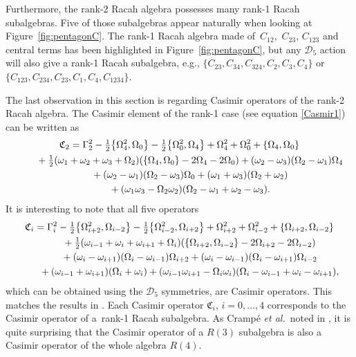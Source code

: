 \documentclass[pdftex]{sigma}
\numberwithin{equation}{section}
\begin{document}
Furthermore, the rank-2 Racah algebra possesses many rank-1 Racah subalgebras. Five of those subalgebras appear naturally when looking at Figure~\ref{fig:pentagonC}. The rank-1 Racah algebra made of~$C_{12}$,~$C_{23}$, $C_{123}$ and central terms has been highlighted in Figure~\ref{fig:pentagonC}, but any $\mathcal{D}_5$ action will also give a rank-1 Racah subalgebra, e.g., $\lbrace\! C_{23},C_{34},C_{324},C_2,C_3,C_4\!\rbrace$ or $\lbrace \!C_{123},C_{234},C_{23},C_{\!1},C_4,C_{1234}\!\rbrace$.

The last observation in this section is regarding Casimir operators of the rank-2 Racah algebra. The Casimir element of the rank-1 case (see equation \eqref{Casmir1}) can be written as
\begin{gather*}
\mathfrak{C}_2= \Gamma_2^2-\tfrac{1}{2}\big\lbrace \Omega_4^2,\Omega_0\big\rbrace-\tfrac{1}{2}\big\lbrace \Omega_0^2,\Omega_4\big\rbrace+\Omega_4^2+\Omega_0^2+\lbrace \Omega_4,\Omega_0\rbrace\\
\hphantom{\mathfrak{C}_2=}{}
+\tfrac{1}{2}(\omega_1+\omega_2+\omega_3+\Omega_2)(\lbrace \Omega_4,\Omega_0\rbrace-2\Omega_4-2\Omega_0)+(\omega_2-\omega_3)(\Omega_2-\omega_1)\Omega_4\\
\hphantom{\mathfrak{C}_2=}{}+(\omega_2-\omega_1)(\Omega_2-\omega_3)\Omega_0+(\omega_1+\omega_3)(\Omega_2+\omega_2)\\
\hphantom{\mathfrak{C}_2=}{}+(\omega_1\omega_3-\Omega_2\omega_2)(\Omega_2-\omega_1+\omega_2-\omega_3).
\end{gather*}
It is interesting to note that all five operators
\begin{gather*}
\mathfrak{C}_i= \Gamma_i^2-\tfrac{1}{2}\big\lbrace \Omega_{i+2}^2,\Omega_{i-2}\big\rbrace-\tfrac{1}{2}\big\lbrace \Omega_{i-2}^2,\Omega_{i+2}\big\rbrace+\Omega_{i+2}^2+\Omega_{i-2}^2+\lbrace \Omega_{i+2},\Omega_{i-2}\rbrace\\
\hphantom{\mathfrak{C}_i=}{} +\tfrac{1}{2}(\omega_{i-1}+\omega_i+\omega_{i+1}+\Omega_i)(\lbrace \Omega_{i+2},\Omega_{i-2}\rbrace-2\Omega_{i+2}-2\Omega_{i-2})\\
\hphantom{\mathfrak{C}_i=}{}+(\omega_i-\omega_{i+1})(\Omega_i-\omega_{i-1})\Omega_{i+2}+(\omega_i-\omega_{i-1})(\Omega_i-\omega_{i+1})\Omega_{i-2}\\
\hphantom{\mathfrak{C}_i=}{}+(\omega_{i-1}+\omega_{i+1})(\Omega_i+\omega_i)+(\omega_{i-1}\omega_{i+1}-\Omega_i\omega_i)(\Omega_i-\omega_{i-1}+\omega_i-\omega_{i+1}),
\end{gather*}
which can be obtained using the $\mathcal{D}_5$ symmetries, are Casimir operators. This matches the results in \cite{Crampe2023,GVZ2013,GZ88}. Each Casimir operator $\mathfrak{C}_i$, $i=0,\dots,4$ corresponds to the Casimir operator of a~rank-1 Racah subalgebra. As Cramp\'e \textit{et al.}~noted in \cite{Crampe2023}, it is quite surprising that the Casimir operator of a $R(3)$ subalgebra is also a Casimir operator of the whole algebra $R(4)$.
\end{document}
